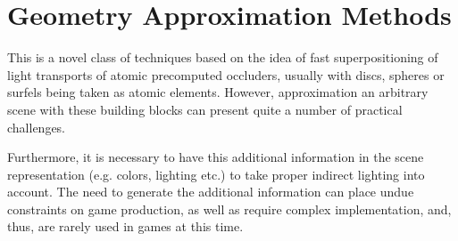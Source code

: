 \chapter{Geometry Approximation Methods}

This is a novel class of techniques based on the idea of fast superpositioning of light transports of atomic precomputed occluders, usually with discs, spheres or surfels being taken as atomic elements. However, approximation an arbitrary scene with these building blocks can present quite a number of practical challenges. 

Furthermore, it is necessary to have this additional information in the scene representation (e.g. colors, lighting etc.) to take proper indirect lighting into account. The need to generate the additional information can place undue constraints on game production, as well as require complex implementation, and, thus, are rarely used in games at this time.